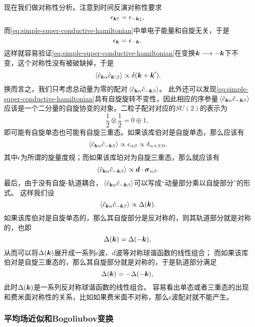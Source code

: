\documentclass[hyperref, UTF8, a4paper]{ctexart}
\begin{document}
现在我们做对称性分析。注意到时间反演对称性要求
\[
    \epsilon_{\vb*{k} \uparrow} = \epsilon_{-\vb*{k} \downarrow},
\]
而\eqref{eq:simple-super-conductive-hamiltonian}中单电子能量和自旋无关，于是
\[
    \epsilon_{\vb*{k}} = \epsilon_{-\vb*{k}}.
\]
这样就容易验证\eqref{eq:simple-super-conductive-hamiltonian}在变换$\vb*{k} \longrightarrow -\vb*{k}$下不变，这个对称性没有被破缺掉，于是
\[
    \expval*{\hat{c}_{\vb*{k}\alpha} \hat{c}_{\vb*{k}' \beta}} \propto \delta(\vb*{k} + \vb*{k}').
\]
换而言之，我们只考虑总动量为零的配对$\expval*{\hat{c}_{\vb*{k} \alpha} \hat{c}_{- \vb*{k} \beta}}$。
此外还可以发现\eqref{eq:simple-super-conductive-hamiltonian}具有自旋旋转不变性，因此相应的序参量$\expval*{\hat{c}_{\vb*{k} \alpha} \hat{c}_{- \vb*{k} \beta}}$应该是一个二分量的自旋协变的对象。二粒子配对对应的$SU(2)$的表示为
\[
    \frac{1}{2} \otimes \frac{1}{2} = 0 \oplus 1,
\]
即可能有自旋单态也可能有自旋三重态。如果该库伯对是自旋单态，那么应该有
\[
    \expval*{\hat{c}_{\vb*{k} \alpha} \hat{c}_{- \vb*{k} \beta}} \propto \epsilon_{\alpha \beta} \propto \delta_{\alpha+\beta,0},
\]
其中$\epsilon$为所谓的旋量度规；而如果该库珀对为自旋三重态，那么就应该有
\[
    \expval*{\hat{c}_{\vb*{k} \alpha} \hat{c}_{- \vb*{k} \beta}} \propto \vb*{d} \cdot \vb*{\sigma}_{\alpha \beta}.
\]
最后，由于没有自旋-轨道耦合，$\expval*{\hat{c}_{\vb*{k} \alpha} \hat{c}_{- \vb*{k} \beta}}$可以写成“动量部分乘以自旋部分”的形式。
这样我们设
\[
    \expval*{\hat{c}_{\vb*{k} \alpha} \hat{c}_{- \vb*{k} \beta}} \propto \Delta(\vb*{k}).
\]
如果该库伯对是自旋单态的，那么其自旋部分是反对称的，则其轨道部分就是对称的，也即
\[
    \Delta(\vb*{k}) = \Delta(-\vb*{k}),
\]
从而可以将$\Delta(\vb*{k})$展开成一系列s波、d波等对称球谐函数的线性组合；
而如果该库伯对是自旋三重态的，那么其自旋部分就是对称的，于是轨道部分满足
\[
    \Delta(\vb*{k}) = -\Delta(-\vb*{k}),
\]
此时$\Delta(\vb*{k})$是一系列反对称球谐函数的线性组合。
容易看出单态或者三重态的出现和费米面对称性的关系，比如如果费米面不对称，那么s波配对就不能产生。

\subsubsection{平均场近似和Bogoliubov变换}
\end{document}
